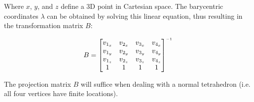 Where $x$, $y$,  and  $z$  define a 3D point in Cartesian space. The barycentric
coordinates $\lambda$ can be obtained  by  solving  this  linear  equation, thus
resulting in the transformation matrix $B$:

\begin{align}
    \label{eq:bary:cartesian}
    B = \begin{bmatrix}
        v_{1_x} & v_{2_x} & v_{3_x} & v_{4_x} \\
        v_{1_y} & v_{2_y} & v_{3_y} & v_{4_y} \\
        v_{1_z} & v_{2_z} & v_{3_z} & v_{4_z} \\
        1 & 1 & 1 & 1 \\
    \end{bmatrix}\inverse
\end{align}

The projection matrix $B$ will suffice  when  dealing  with a normal tetrahedron
(i.e. all four vertices have finite locations).
